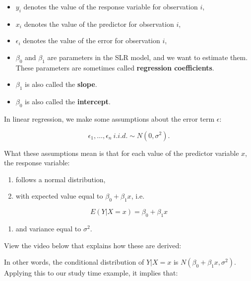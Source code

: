 \documentclass[
]{book}
\providecommand{\tightlist}{%
  \setlength{\itemsep}{0pt}\setlength{\parskip}{0pt}}
\begin{document}
\begin{itemize}
\tightlist
\item
  \(y_i\) denotes the value of the response variable for observation \(i\),
\item
  \(x_i\) denotes the value of the predictor for observation \(i\),
\item
  \(\epsilon_i\) denotes the value of the error for observation \(i\),
\item
  \(\beta_0\) and \(\beta_1\) are parameters in the SLR model, and we want to estimate them. These parameters are sometimes called \textbf{regression coefficients}.
\item
  \(\beta_1\) is also called the \textbf{slope}.
\item
  \(\beta_0\) is also called the \textbf{intercept}.
\end{itemize}

In linear regression, we make some assumptions about the error term \(\epsilon\):

\begin{equation} 
\epsilon_1,\ldots,\epsilon_n \ i.i.d. \sim N(0,\sigma^2).
\label{eq:10-assumptions}
\end{equation}

What these assumptions mean is that for each value of the predictor variable \(x\), the response variable:

\begin{enumerate}
\def\labelenumi{\arabic{enumi}.}
\tightlist
\item
  follows a normal distribution,
\item
  with expected value equal to \(\beta_0+\beta_{1} x\), i.e.
\end{enumerate}

\begin{equation} 
E(Y|X=x) = \beta_0+\beta_{1} x 
\label{eq:10-SLR}
\end{equation}

\begin{enumerate}
\def\labelenumi{\arabic{enumi}.}
\setcounter{enumi}{2}
\tightlist
\item
  and variance equal to \(\sigma^2\).
\end{enumerate}

View the video below that explains how these are derived:

In other words, the conditional distribution of \(Y|X=x\) is \(N(\beta_0+\beta_{1} x, \sigma^2)\). Applying this to our study time example, it implies that:
\end{document}
